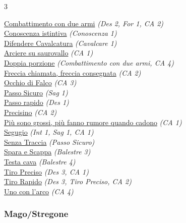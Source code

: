 \begin{multicols}{3}
{\begin{flushleft}
\hyperlink{Combattimento con due armi}{Combattimento con due armi} \textit{(Des 2, For 1, CA 2)}\\
\hyperlink{Conoscenza istintiva}{Conoscenza istintiva} \textit{(Conoscenza 1)}\\
\hyperlink{Difendere Cavalcatura}{Difendere Cavalcatura} \textit{(Cavalcare 1)}\\
\hyperlink{Arciere su saurovallo}{Arciere su saurovallo} \textit{(CA 1)}\\
\hyperlink{Doppia porzione}{Doppia porzione} \textit{(Combattimento con due armi, CA 4)}\\
\hyperlink{Freccia chiamata, freccia consegnata}{Freccia chiamata, freccia consegnata} \textit{(CA 2)}\\
\hyperlink{Occhio di Falco}{Occhio di Falco} \textit{(CA 3)}\\
\hyperlink{Passo Sicuro}{Passo Sicuro} \textit{(Sag 1)}\\
\hyperlink{Passo rapido}{Passo rapido} \textit{(Des 1)}\\
\hyperlink{Precisino}{Precisino} \textit{(CA 2)}\\
\hyperlink{Più sono grossi, più fanno rumore quando cadono}{Più sono grossi, più fanno rumore quando cadono} \textit{(CA 1)}\\
\hyperlink{Segugio}{Segugio} \textit{(Int 1, Sag 1, CA 1)}\\
\hyperlink{Senza Traccia}{Senza Traccia} \textit{(Passo Sicuro)}\\
\hyperlink{Spara e Scappa}{Spara e Scappa} \textit{(Balestre 3)}\\
\hyperlink{Testa cava}{Testa cava} \textit{(Balestre 4)}\\
\hyperlink{Tiro Preciso}{Tiro Preciso} \textit{(Des 3, CA 1)}\\
\hyperlink{Tiro Rapido}{Tiro Rapido} \textit{(Des 3, Tiro Preciso, CA 2)}\\
\hyperlink{Uno con l'arco}{Uno con l'arco} \textit{(CA 4)}\\

\subsubsection*{Mago/Stregone}


\end{flushleft}}
\end{multicols}
